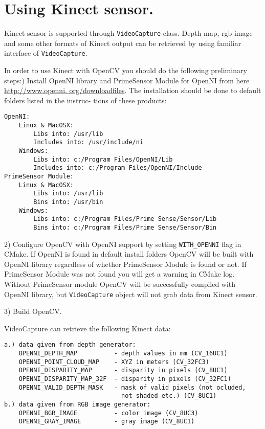 

\ifCpp
\section{Using Kinect sensor.}

Kinect sensor is supported through \texttt{VideoCapture} class. Depth map, rgb image and some other formats of Kinect 
output can be retrieved by using familiar interface of \texttt{VideoCapture}.\par

In order to use Kinect with OpenCV you should do the following preliminary steps:) Install OpenNI library and PrimeSensor Module for OpenNI from here \url{http://www.openni.
org/downloadfiles}. The installation should be done to default folders listed in the instruc-
tions of these products:
\begin{lstlisting}
OpenNI:
	Linux & MacOSX:
		Libs into: /usr/lib
		Includes into: /usr/include/ni
	Windows:
		Libs into: c:/Program Files/OpenNI/Lib
		Includes into: c:/Program Files/OpenNI/Include
PrimeSensor Module:
	Linux & MacOSX:
		Libs into: /usr/lib
		Bins into: /usr/bin
	Windows:
		Libs into: c:/Program Files/Prime Sense/Sensor/Lib
		Bins into: c:/Program Files/Prime Sense/Sensor/Bin
\end{lstlisting}
2) Configure OpenCV with OpenNI support by setting \texttt{WITH\_OPENNI} flag in CMake. If OpenNI
is found in default install folders OpenCV will be built with OpenNI library regardless of whether
PrimeSensor Module is found or not. If PrimeSensor Module was not found you will get a warning
in CMake log. Without PrimeSensor module OpenCV will be successfully compiled with OpenNI library, but \texttt{VideoCapture} object will not grab data from Kinect sensor. \par

3) Build OpenCV.\par

VideoCapture can retrieve the following Kinect data:
\begin{lstlisting}
a.) data given from depth generator:
	OPENNI_DEPTH_MAP          - depth values in mm (CV_16UC1)
	OPENNI_POINT_CLOUD_MAP    - XYZ in meters (CV_32FC3)
	OPENNI_DISPARITY_MAP      - disparity in pixels (CV_8UC1)
	OPENNI_DISPARITY_MAP_32F  - disparity in pixels (CV_32FC1)
	OPENNI_VALID_DEPTH_MASK   - mask of valid pixels (not ocluded,
                                not shaded etc.) (CV_8UC1)
b.) data given from RGB image generator:
	OPENNI_BGR_IMAGE          - color image (CV_8UC3)
	OPENNI_GRAY_IMAGE         - gray image (CV_8UC1)
\end{lstlisting}

